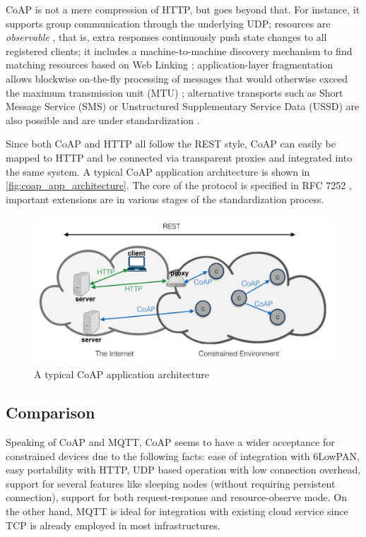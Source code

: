 CoAP is not a mere compression of HTTP, but goes beyond that. For instance, it supports group communication through the underlying UDP; resources are \textit{observable} \cite{coap_observe}, that is, extra responses continuously push state changes to all registered clients; it includes a machine-to-machine discovery mechanism to find matching resources based on Web Linking \cite{core}; application-layer fragmentation allows blockwise on-the-fly processing of messages that would otherwise exceed the maximum transmission unit (MTU) \cite{blockwise}; alternative transports such as Short Message Service (SMS) or Unstructured Supplementary Service Data (USSD) are also possible and are under standardization \cite{coap_alter_trans}.

Since both CoAP and HTTP all follow the REST style, CoAP can easily be mapped to HTTP and be connected via transparent proxies and integrated into the same system. A typical CoAP application architecture is shown in \autoref{fig:coap_app_architecture}. The core of the protocol is specified in RFC 7252 \cite{coap_protocol}, important extensions are in various stages of the standardization process. 

\begin{figure}[!htbp]
\centering
\includegraphics[scale = 0.55]{coap_app_architecture.png}
\caption{A typical CoAP application architecture}
\label{fig:coap_app_architecture}
\end{figure}

\subsection{Comparison}

Speaking of CoAP and MQTT, CoAP seems to have a wider acceptance for constrained devices due to the following facts: ease of integration with 6LowPAN, easy portability with HTTP, UDP based operation with low connection overhead, support for several features like sleeping nodes \cite{coap_protocol}(without requiring persistent connection), support for both request-response and resource-observe mode. On the other hand, MQTT is ideal for integration with existing cloud service since TCP is already employed in most infrastructures. 

